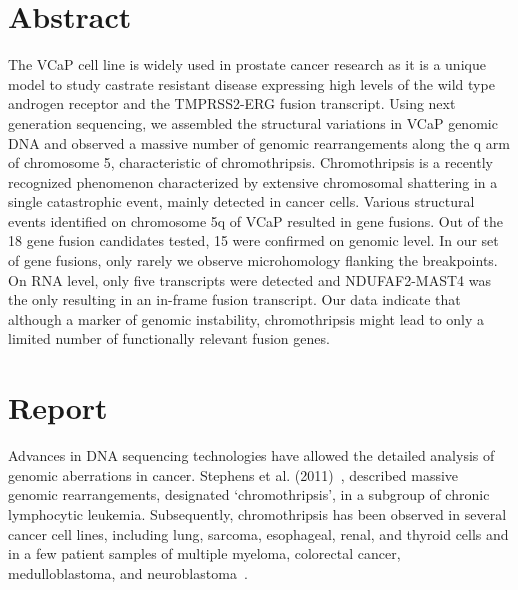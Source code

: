 \normalsize

\section*{Abstract}
The VCaP cell line is widely used in prostate cancer research as it is a unique model to study castrate resistant disease expressing high levels of
the wild type androgen receptor and the TMPRSS2-ERG fusion transcript. Using next generation sequencing, we assembled the structural variations in
VCaP genomic DNA and observed a massive number of genomic rearrangements along the q arm of chromosome 5, characteristic of chromothripsis.
Chromothripsis is a recently recognized phenomenon characterized by extensive chromosomal shattering in a single catastrophic event, mainly detected
in cancer cells. Various structural events identified on chromosome 5q of VCaP resulted in gene fusions. Out of the 18 gene fusion candidates tested,
15 were confirmed on genomic level. In our set of gene fusions, only rarely we observe microhomology flanking the breakpoints. On RNA level, only five
transcripts were detected and NDUFAF2-MAST4 was the only resulting in an in-frame fusion transcript. Our data indicate that although a marker of genomic
instability, chromothripsis might lead to only a limited number of functionally relevant fusion genes.


\section*{Report}
Advances in DNA sequencing technologies have allowed the detailed analysis of genomic aberrations in cancer. Stephens et al. (2011)~\cite{stephens2011massive}, described massive genomic rearrangements, designated ‘chromothripsis’, in a subgroup of chronic lymphocytic leukemia. Subsequently, chromothripsis has been observed in several cancer cell lines, including lung, sarcoma, esophageal, renal, and thyroid cells and in a few patient samples of multiple myeloma, colorectal cancer, medulloblastoma, and neuroblastoma~\cite{magrangeas2011chromothripsis,kloosterman2011chromothripsis,rausch2012genome,molenaar2012sequencing}.


